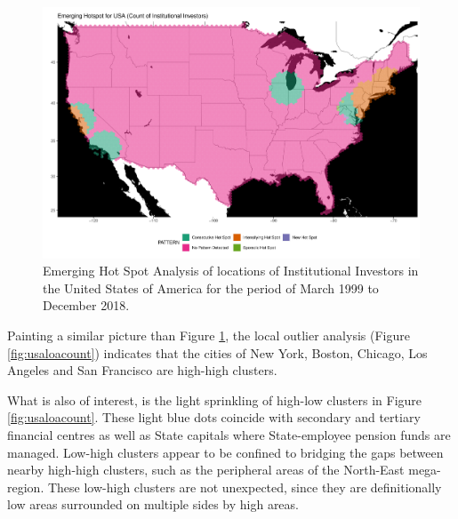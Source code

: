 \begin{figure}[h]
	\centering
	\includegraphics[width=1\linewidth]{Figures/ChapterIV/USA_Count_EH}
	\caption[Emerging Hot Spot Analysis of Locations of Institutional Investors in the USA 1999-2018]{Emerging Hot Spot Analysis of locations of Institutional Investors in the United States of America for the period of March 1999 to December 2018.}
	\label{fig:usahspcount}
\end{figure}

Painting a similar picture than Figure \ref{fig:usahspcount},  the local outlier analysis (Figure \ref{fig:usaloacount}) indicates that the cities of New York, Boston, Chicago, Los Angeles and San Francisco are high-high clusters.  

What is also of interest, is the light sprinkling of high-low clusters in Figure \ref{fig:usaloacount}.  These light blue dots coincide with secondary and tertiary financial centres as well as State capitals where State-employee pension funds are managed.  
Low-high clusters appear to be confined to bridging the gaps between nearby high-high clusters, such as the peripheral areas of the North-East mega-region.  These low-high clusters are not unexpected, since they are definitionally low areas surrounded on multiple sides by high areas.     

